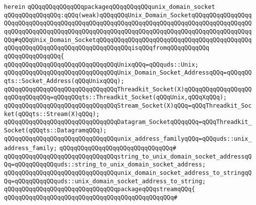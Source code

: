 \verb|herein|\newline
\newline
\verb|qQQqqQQqqQQqqQQqpackageqQQqqQQqqQQqunix_domain_socket|\newline
\verb|qQQqqQQqqQQqqQQq:qQQq(weak)qQQqqQQqUnix_Domain_SocketqQQqqQQqqQQqqQQqqQQqqQQqqQQqqQQqqQQqqQQqqQQqqQQqqQQqqQQqqQQqqQQqqQQqqQQqqQQqqQQqqQQqqQQqqQQqqQQqqQQqqQQqqQQqqQQqqQQqqQQqqQQqqQQqqQQqqQQqqQQqqQQqqQQqqQQqqQQqqQQq#qQQqUnix_Domain_SocketqQQqqQQqqQQqqQQqqQQqqQQqqQQqqQQqqQQqqQQqqQQqqQQqqQQqqQQqqQQqqQQqqQQqqQQqqQQqqQQqisqQQqfromqQQqqQQqqQQq|\newline
\verb|qQQqqQQqqQQqqQQq{|\newline
\verb|qQQqqQQqqQQqqQQqqQQqqQQqqQQqqQQqUnixqQQq=qQQquds::Unix;|\newline
\newline
\verb|qQQqqQQqqQQqqQQqqQQqqQQqqQQqqQQqUnix_Domain_Socket_AddressqQQq=qQQqqQQqts::Socket_Address(qQQqUnixqQQq);|\newline
\verb|qQQqqQQqqQQqqQQqqQQqqQQqqQQqqQQqThreadkit_Socket(X)qQQqqQQqqQQqqQQqqQQqqQQqqQQqqQQq=qQQqqQQqts::Threadkit_Socket(qQQqUnix,qQQqXqQQq);|\newline
\newline
\verb|qQQqqQQqqQQqqQQqqQQqqQQqqQQqqQQqStream_Socket(X)qQQq=qQQqThreadkit_Socket(qQQqts::Stream(X)qQQq);|\newline
\verb|qQQqqQQqqQQqqQQqqQQqqQQqqQQqqQQqDatagram_SocketqQQqqQQq=qQQqThreadkit_Socket(qQQqts::DatagramqQQq);|\newline
\newline
\newline
\verb|qQQqqQQqqQQqqQQqqQQqqQQqqQQqqQQqunix_address_familyqQQq=qQQquds::unix_address_family;|\newline
\verb|qQQqqQQqqQQqqQQqqQQqqQQqqQQqqQQq#|\newline
\verb|qQQqqQQqqQQqqQQqqQQqqQQqqQQqqQQqstring_to_unix_domain_socket_addressqQQq=qQQqqQQqqQQquds::string_to_unix_domain_socket_address;|\newline
\verb|qQQqqQQqqQQqqQQqqQQqqQQqqQQqqQQqunix_domain_socket_address_to_stringqQQq=qQQqqQQqqQQquds::unix_domain_socket_address_to_string;|\newline
\newline
\verb|qQQqqQQqqQQqqQQqqQQqqQQqqQQqqQQqpackageqQQqstreamqQQq{|\newline
\verb|qQQqqQQqqQQqqQQqqQQqqQQqqQQqqQQqqQQqqQQqqQQqqQQq#|\newline
